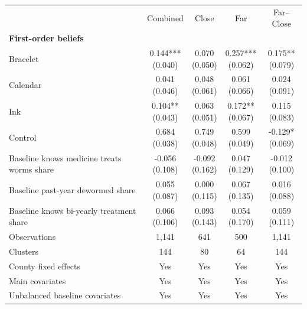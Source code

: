 \begin{tabular}{lcccc}
\toprule
 & Combined & Close & Far & Far--Close \\
\multicolumn{5}{l}{\textbf{First-order beliefs}} \\
\addlinespace[0.2em]
Bracelet & \makecell[c]{0.144***\\{(0.040)}} & \makecell[c]{0.070\\{(0.050)}} & \makecell[c]{0.257***\\{(0.062)}} & \makecell[c]{0.175**\\{(0.079)}} \\
Calendar & \makecell[c]{0.041\\{(0.046)}} & \makecell[c]{0.048\\{(0.061)}} & \makecell[c]{0.061\\{(0.066)}} & \makecell[c]{0.024\\{(0.091)}} \\
Ink & \makecell[c]{0.104**\\{(0.043)}} & \makecell[c]{0.063\\{(0.051)}} & \makecell[c]{0.172**\\{(0.067)}} & \makecell[c]{0.115\\{(0.083)}} \\
Control & \makecell[c]{0.684\\{(0.038)}} & \makecell[c]{0.749\\{(0.048)}} & \makecell[c]{0.599\\{(0.049)}} & \makecell[c]{-0.129*\\{(0.069)}} \\
\addlinespace[0.3em]
Baseline knows medicine treats worms share & \makecell[c]{-0.056\\{(0.108)}} & \makecell[c]{-0.092\\{(0.162)}} & \makecell[c]{0.047\\{(0.129)}} & \makecell[c]{-0.012\\{(0.100)}} \\
Baseline past-year dewormed share & \makecell[c]{0.055\\{(0.087)}} & \makecell[c]{0.000\\{(0.115)}} & \makecell[c]{0.067\\{(0.135)}} & \makecell[c]{0.016\\{(0.088)}} \\
Baseline knows bi-yearly treatment share & \makecell[c]{0.066\\{(0.106)}} & \makecell[c]{0.093\\{(0.143)}} & \makecell[c]{0.054\\{(0.170)}} & \makecell[c]{0.059\\{(0.111)}} \\
\addlinespace[0.3em]
Observations & 1,141 & 641 & 500 & 1,141 \\
Clusters & 144 & 80 & 64 & 144 \\
County fixed effects & Yes & Yes & Yes & Yes \\
Main covariates & Yes & Yes & Yes & Yes \\
Unbalanced baseline covariates & Yes & Yes & Yes & Yes \\
\bottomrule
\end{tabular}
